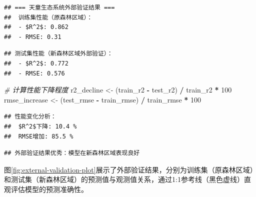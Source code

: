 \documentclass[
  twoside,12pt,fontset=none]{ctexbook}
\newenvironment{Shaded}{\begin{snugshade}}{\end{snugshade}}
\newcommand{\AttributeTok}[1]{\textcolor[rgb]{0.13,0.29,0.53}{#1}}
\newcommand{\CommentTok}[1]{\textcolor[rgb]{0.56,0.35,0.01}{\textit{#1}}}
\newcommand{\DecValTok}[1]{\textcolor[rgb]{0.00,0.00,0.81}{#1}}
\newcommand{\FunctionTok}[1]{\textcolor[rgb]{0.13,0.29,0.53}{\textbf{#1}}}
\newcommand{\NormalTok}[1]{#1}
\newcommand{\OtherTok}[1]{\textcolor[rgb]{0.56,0.35,0.01}{#1}}
\newcommand{\SpecialCharTok}[1]{\textcolor[rgb]{0.81,0.36,0.00}{\textbf{#1}}}
\begin{document}
\begin{Shaded}
\end{Shaded}

\begin{verbatim}
## === 天童生态系统外部验证结果 ===
##  训练集性能（原森林区域）：
##  - $R^2$: 0.862 
##  - RMSE: 0.31
\end{verbatim}

\begin{verbatim}
## 测试集性能（新森林区域外部验证）：
##  - $R^2$: 0.772 
##  - RMSE: 0.576
\end{verbatim}

\begin{Shaded}
\begin{Highlighting}[]
\CommentTok{\# 计算性能下降程度}
\NormalTok{r2\_decline }\OtherTok{\textless{}{-}}\NormalTok{ (train\_r2 }\SpecialCharTok{{-}}\NormalTok{ test\_r2) }\SpecialCharTok{/}\NormalTok{ train\_r2 }\SpecialCharTok{*} \DecValTok{100}
\NormalTok{rmse\_increase }\OtherTok{\textless{}{-}}\NormalTok{ (test\_rmse }\SpecialCharTok{{-}}\NormalTok{ train\_rmse) }\SpecialCharTok{/}\NormalTok{ train\_rmse }\SpecialCharTok{*} \DecValTok{100}
\end{Highlighting}
\end{Shaded}

\begin{verbatim}
## 性能变化分析：
##  $R^2$下降: 10.4 %
##  RMSE增加: 85.5 %
\end{verbatim}

\begin{verbatim}
## 外部验证结果优秀：模型在新森林区域表现良好
\end{verbatim}

图\ref{fig:external-validation-plot}展示了外部验证结果，分别为训练集（原森林区域）和测试集（新森林区域）的预测值与观测值关系，通过1:1参考线（黑色虚线）直观评估模型的预测准确性。
\end{document}
